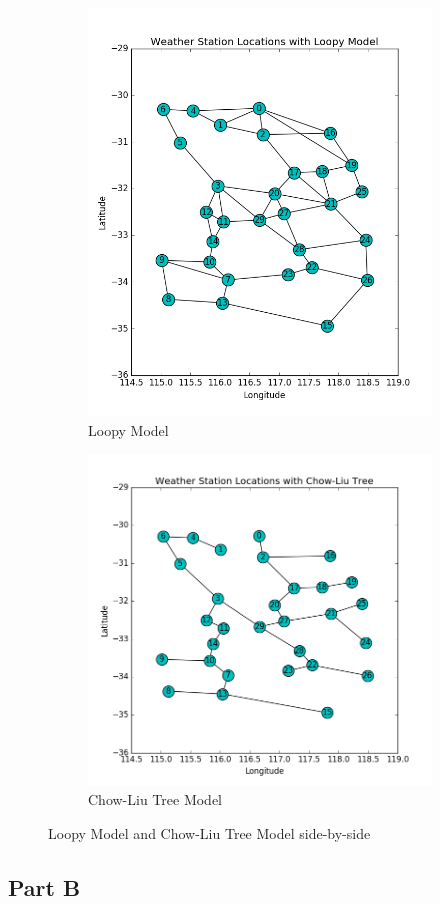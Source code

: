 \documentclass[twoside,11pt]{article}
\theoremstyle{definition}
\begin{document}
\begin{figure}[h]
\centering
\begin{subfigure}{.5\textwidth}
  \centering
  \includegraphics[width=3 in]{loopyModelFigure2.png}
  \caption{Loopy Model}
\end{subfigure}%
\begin{subfigure}{.5\textwidth}
  \centering
  \includegraphics[width=3 in]{chowLiuTreeFigure2.png}
  \caption{Chow-Liu Tree Model}
\end{subfigure}
\caption{Loopy Model and Chow-Liu Tree Model side-by-side}
\end{figure}

\newpage

\subsection*{Part B}
\end{document}
